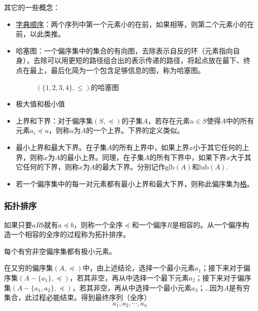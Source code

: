 其它的一些概念：
\begin{itemize}
    \item \uline{字典顺序}：两个序列中第一个元素小的在前，如果相等，则第二个元素小的在前，以此类推。

    \item 哈塞图：一个偏序集中的集合的有向图，去除表示自反的环（元素指向自身），去除可以用更短的路径组合出的表示传递的路径，将起点放在最下、终点在最上，最后化简为一个包含足够信息的图，称为哈塞图。

    \begin{figure*}[htbp]
        \centering
        \caption{$(\{1,2,3,4\}, \leq)$的哈塞图}
    \end{figure*}

    \item 极大值和极小值
    \item 上界和下界：对于偏序集$(S, \preccurlyeq)$的子集$A$，若存在元素$u \in S$使得$A$中的所有元素$a_i \preccurlyeq u$，则称$u$为$A$的一个上界。下界的定义类似。
    \item 最小上界和最大下界。在子集$A$的所有上界中，如果上界$x$小于其它任何的上界，则称$x$为$A$的最小上界。同理，在子集$A$的所有下界中，如果下界$x$大于其它任何的下界，则称$x$为$A$的最大下界。分别记作$\mathrm{glb} (A)$和$\mathrm{lub} (A)$.

    \item 若一个偏序集中的每一对元素都有最小上界和最大下界，则称此偏序集为\uline{格}。
\end{itemize}

\subsubsection*{拓扑排序}
如果只要$aRb$就有$a \preccurlyeq b$，则称一个全序$\preccurlyeq$和一个偏序$R$是相容的。从一个偏序构造一个相容的全序的过程称为拓扑排序。

每个有穷非空偏序集都有极小元素。

在又穷的偏序集$(A, \preccurlyeq)$中，由上述结论，选择一个最小元素$a_1$；接下来对于偏序集$(A-\{ a_1 \}, \preccurlyeq)$，若其非空，再从中选择一个最下元素$a_2$；接下来对于偏序集$(A-\{ a_1, a_2 \}, \preccurlyeq)$，若其非空，再从中选择一个最小元素$a_3$；\ldots 因为$A$是有穷集合，此过程必能结束。得到最终序列（全序）
\[ a_1, a_2, \cdots, a_n \]

